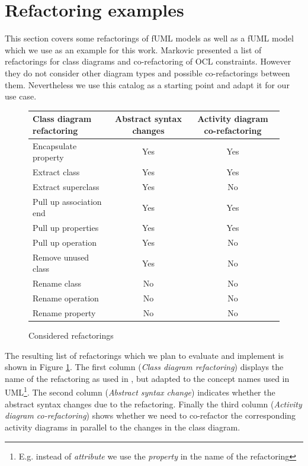 \documentclass{llncs}
\begin{document}


\section{Refactoring examples}
\label{refactoring-examples}

This section covers some refactorings of fUML models as well as a fUML model which we use as an example for this work. 
Markovic \cite{DBLP:journals/sosym/MarkovicB08} presented a list of refactorings for class 
diagrams and co-refactoring of OCL constraints. However they do not consider other diagram types and possible co-refactorings between 
them. Nevertheless we use this catalog as a starting point and adapt it for our use case. 

\begin{figure}[h!t]
 \centering
 \begin{tabular}[]{l | c | c}
  Class diagram refactoring & Abstract syntax changes & Activity diagram co-refactoring\\
  \hline
  Encapsulate property & Yes & Yes\\
  Extract class & Yes & Yes\\
  Extract superclass & Yes & No\\
  Pull up association end & Yes & Yes\\
  Pull up properties & Yes & Yes\\
  Pull up operation & Yes & No\\
  Remove unused class & Yes & No\\
  Rename class & No & No\\
  Rename operation & No & No\\
  Rename property & No & No\\
 \end{tabular}
 \caption{Considered refactorings}
 \label{fig:refactoringlist}
\end{figure}

The resulting list of 
refactorings which we plan to evaluate and implement is shown in Figure \ref{fig:refactoringlist}. 
The first column (\textit{Class diagram refactoring}) displays the name of the refactoring as used in \cite{DBLP:journals/sosym/MarkovicB08}, but adapted to the 
concept names used in UML\footnote{E.g. instead of \textit{attribute} we use the \textit{property} in the name of the refactoring}. 
The second column (\textit{Abstract syntax change}) indicates whether the abstract syntax changes due to the refactoring.
Finally the third column (\textit{Activity diagram co-refactoring}) shows whether we need to co-refactor the corresponding activity diagrams 
in parallel to the changes in the class diagram.
\end{document}

